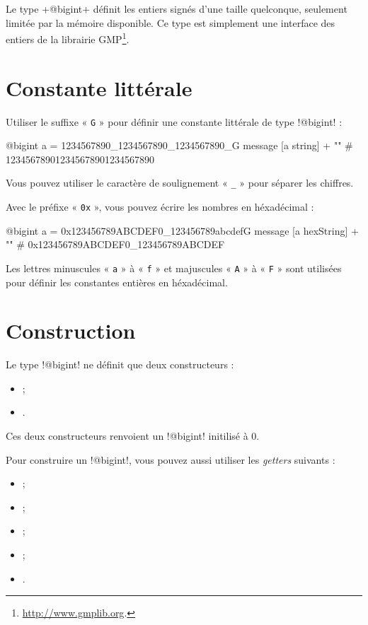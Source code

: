 

Le type \ggs+@bigint+ définit les entiers signés d'une taille quelconque, seulement limitée par la mémoire disponible. Ce type est simplement une interface des entiers de la librairie GMP\footnote{\url{http://www.gmplib.org}.}.

\section{Constante littérale}

Utiliser le suffixe « \texttt{G} » pour définir une constante littérale de type \ggs!@bigint! :
\begin{galgas}
@bigint a = 1234567890_1234567890_1234567890_G
message [a string] + "\n" # 123456789012345678901234567890
\end{galgas}

Vous pouvez utiliser le caractère de soulignement « \texttt{\_} » pour séparer les chiffres.

Avec le préfixe « \texttt{0x} », vous pouvez écrire les nombres en héxadécimal :
\begin{galgas}
@bigint a = 0x123456789ABCDEF0_123456789abcdefG
message [a hexString] + "\n" # 0x123456789ABCDEF0_123456789ABCDEF
\end{galgas}

Les lettres minuscules « \texttt{a} » à « \texttt{f} » et majuscules « \texttt{A} » à « \texttt{F} » sont utilisées pour définir les constantes entières en héxadécimal.

\section{Construction}

Le type \ggs!@bigint! ne définit que deux constructeurs :
\begin{itemize}
  \item {} ;
  \item {}.
\end{itemize}

Ces deux constructeurs renvoient un \ggs!@bigint! initilisé à $0$.

Pour construire un \ggs!@bigint!, vous pouvez aussi utiliser les \emph{getters} suivants :
\begin{itemize}
  \item {} ;
  \item {} ;
  \item {} ;
  \item {} ;
  \item {}.
\end{itemize}

